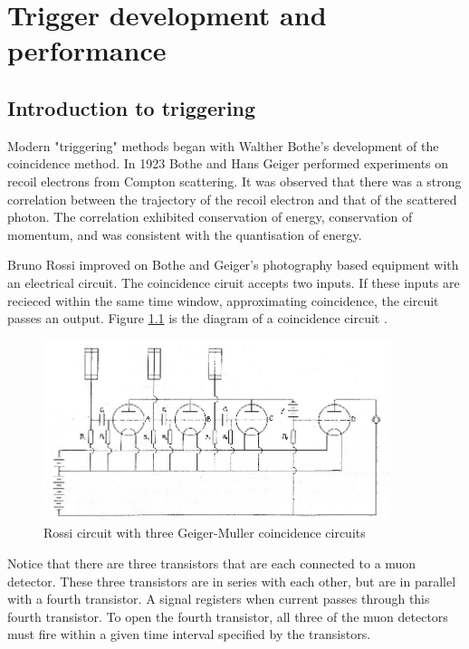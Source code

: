 \setlength\abovedisplayskip{0.4pt}
\setlength\belowdisplayskip{0.4pt}

\chapter{Trigger development and performance}

\section{Introduction to triggering}

Modern "triggering" methods began with Walther Bothe's development of the coincidence method. In 1923 Bothe and Hans Geiger performed experiments on recoil electrons from Compton scattering. It was observed that there was a strong correlation between the trajectory of the recoil electron and that of the scattered photon. The correlation exhibited conservation of energy, conservation of momentum, and was consistent with the quantisation of energy. 

Bruno Rossi improved on Bothe and Geiger's photography based equipment with an electrical circuit. The coincidence ciruit accepts two inputs. If these inputs are recieced within the same time window, approximating coincidence, the circuit passes an output. Figure \ref{fig:ross} is the diagram of a coincidence circuit \cite{Bonolis:2011ph}. 
\begin{figure}[h!]
\begin{centering}
\includegraphics[width=4in]{Chapter5/importfigs/Rossis-coincidence-circuit-appearing-in-Ref-65-The-selecting-resistance-on-the-right.png}
\par\end{centering}
\caption{Rossi circuit with three Geiger-Muller coincidence circuits \cite{Bonolis:2011ph} \label{fig:ross}}
\end{figure}
Notice that there are three transistors that are each connected to a muon detector. These three transistors are in series with each other, but are in parallel with a fourth transistor. A signal registers when current passes through this fourth transistor. To open the fourth transistor, all three of the muon detectors must fire within a given time interval specified by the transistors.

